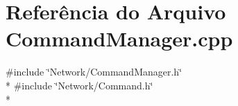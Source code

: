 \section{Referência do Arquivo Command\+Manager.\+cpp}
\label{_command_manager_8cpp}
{\ttfamily \#include \char`\"{}Network/\+Command\+Manager.\+h\char`\"{}}\\*
{\ttfamily \#include \char`\"{}Network/\+Command.\+h\char`\"{}}\\*
